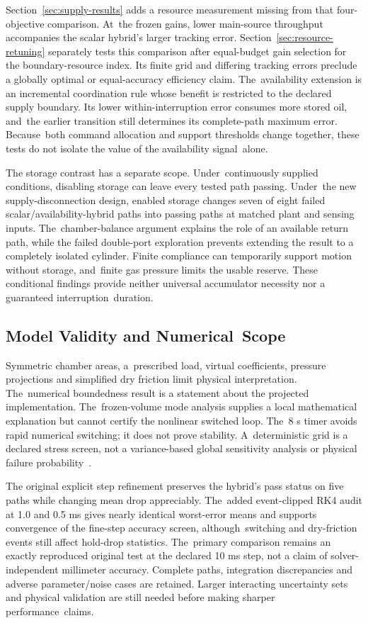 \documentclass[machines,article,submit,pdftex,moreauthors]{Definitions/mdpi}
\begin{document}
Section~\ref{sec:supply-results} adds a resource measurement missing from that four-objective comparison. At~the frozen gains, lower main-source throughput accompanies the scalar hybrid's larger tracking error. Section~\ref{sec:resource-retuning} separately tests this comparison after equal-budget gain selection for the boundary-resource index. Its finite grid and differing tracking errors preclude a globally optimal or equal-accuracy efficiency claim. The~availability extension is an incremental coordination rule whose benefit is restricted to the declared supply boundary. Its lower within-interruption error consumes more stored oil, and~the earlier transition still determines its complete-path maximum error. Because~both command allocation and support thresholds change together, these tests do not isolate the value of the availability signal~alone.

The storage contrast has a separate scope. Under~continuously supplied conditions, disabling storage can leave every tested path passing. Under~the new supply-disconnection design, enabled storage changes seven of eight failed scalar/availability-hybrid paths into passing paths at matched plant and sensing inputs. The~chamber-balance argument explains the role of an available return path, while the failed double-port exploration prevents extending the result to a completely isolated cylinder. Finite compliance can temporarily support motion without storage, and~finite gas pressure limits the usable reserve. These conditional findings provide neither universal accumulator necessity nor a guaranteed interruption~duration.

\subsection{Model Validity and Numerical~Scope}
Symmetric chamber areas, a~prescribed load, virtual coefficients, pressure projections and simplified dry friction limit physical interpretation. The~numerical boundedness result is a statement about the projected implementation. The~frozen-volume mode analysis supplies a local mathematical explanation but cannot certify the nonlinear switched loop. The~8 s timer avoids rapid numerical switching; it does not prove stability. A~deterministic grid is a declared stress screen, not a variance-based global sensitivity analysis or physical failure probability~\cite{saltelli2010}.

The original explicit step refinement preserves the hybrid's pass status on five paths while changing mean drop appreciably. The~added event-clipped RK4 audit at 1.0 and 0.5 ms gives nearly identical worst-error means and supports convergence of the fine-step accuracy screen, although~switching and dry-friction events still affect hold-drop statistics. The~primary comparison remains an exactly reproduced original test at the declared 10 ms step, not a claim of solver-independent millimeter accuracy. Complete paths, integration discrepancies and adverse parameter/noise cases are retained. Larger interacting uncertainty sets and physical validation are still needed before making sharper performance~claims.
\end{document}
